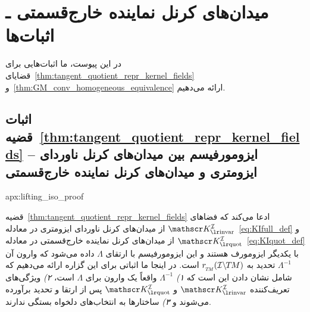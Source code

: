

\section{میدان‌های کرنل نماینده خارج‌قسمتی ـ اثبات‌ها}
\label{apx:lifting_iso_proof}


در این پیوست، ما اثبات‌هایی برای قضایای~\ref{thm:tangent_quotient_repr_kernel_fields} و~\ref{thm:GM_conv_homogeneous_equivalence} ارائه می‌دهیم.


\toclesslab\subsection{اثبات قضیه~\ref{thm:tangent_quotient_repr_kernel_fields} -- ایزومورفیسم بین میدان‌های کرنل ناوردای ایزومتری و میدان‌های کرنل نماینده خارج‌قسمتی}{apx:lifting_iso_proof}


قضیه~\ref{thm:tangent_quotient_repr_kernel_fields} ادعا می‌کند که فضاهای $\KIfull$ از میدان‌های کرنل ناوردای ایزومتری در معادله~\eqref{eq:KIfull_def} و $\KIquot$ از میدان‌های کرنل نماینده خارج‌قسمتی در معادله~\eqref{eq:KIquot_def} با یکدیگر ایزومورف هستند و این ایزومورفیسم با ارتقای $\Lambda$ داده می‌شود که وارون آن $\Lambda^{-1}$ تحدید به $\rTM(\ITM)$ است.
در اینجا ما اثباتی برای این گزاره ارائه می‌دهیم که شامل نشان دادن این است که
\textit{۱)} $\Lambda^{-1}$ واقعاً یک وارون برای $\Lambda$ است،
\textit{۲)} ویژگی‌های تعریف‌کننده $\KIfull$ و $\KIquot$ پس از ارتقا و تحدید برآورده می‌شوند و
\textit{۳)} ساختارها به انتخاب‌های دلخواه بستگی ندارند.



